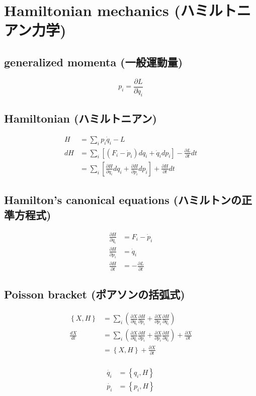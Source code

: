 %
%
\section{Hamiltonian mechanics (ハミルトニアン力学)}


\subsection{generalized momenta (一般運動量)}
\begin{equation}
  p_i = \frac{ \partial L }{ \partial \dot{q}_i }
\end{equation}


\subsection{Hamiltonian (ハミルトニアン)}
\begin{align}
  H & = \sum_i p_i \dot{q}_i - L \\
  dH
      & = \sum_i \left[ \left( F_i - {\dot p}_i \right) d q_i + {\dot q_i} d p_i \right] - \frac{ \partial L }{\partial t} d t \\
      & = \sum_i \left[ \frac{ \partial H }{ \partial q_i } d q_i + \frac{ \partial H }{ \partial p_i } d p_i \right] + \frac{ \partial H }{ \partial t } d t
\end{align}


\subsection{Hamilton's canonical equations (ハミルトンの正準方程式)}
\begin{align}
  \frac{ \partial H }{ \partial q_i }
      & = F_i - \dot{p}_i \\
  \frac{ \partial H }{ \partial p_i }
      & = \dot{q}_i \\
  \frac{ \partial H }{ \partial t }
      & = - \frac{ \partial L }{ \partial t }
\end{align}


\subsection{Poisson bracket (ポアソンの括弧式)}
\begin{align}
  \left\{ X , H \right\}
      & = \sum_i \left( \frac{\partial X}{\partial q_i}\frac{\partial H}{\partial p_i} + \frac{\partial X}{\partial p_i}\frac{\partial H}{\partial q_i} \right) \\
  \frac{dX}{dt}
      & = \sum_i \left( \frac{\partial X}{\partial q_i}\frac{\partial H}{\partial p_i} + \frac{\partial X}{\partial p_i}\frac{\partial H}{\partial q_i} \right) + \frac{\partial X}{\partial t} \\
      & = \left\{ X , H \right\} + \frac{\partial X}{\partial t} \\
\end{align}

\begin{align}
  \dot{q_i} & = \left\{ q_i , H \right\} \\
  \dot{p_i} & = \left\{ p_i , H \right\} \\
\end{align}
